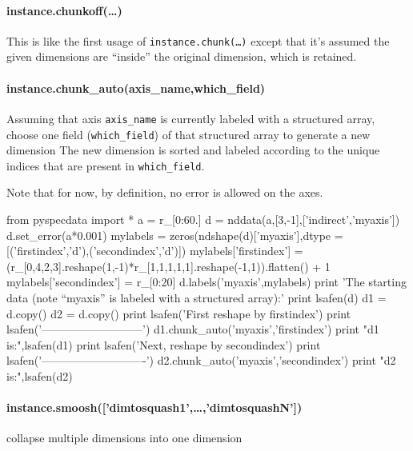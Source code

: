 \paragraph{instance.chunkoff(\ldots)}
This is like the first usage of \texttt{instance.chunk(\ldots)} except that it's assumed the given dimensions are ``inside'' the original dimension, which is retained.
\paragraph{instance.chunk\_auto(axis\_name,which\_field)}
Assuming that axis \texttt{axis\_name} is currently labeled with a structured array, choose one field (\texttt{which\_field}) of that structured array to generate a new dimension
The new dimension is sorted and labeled according to the unique indices that are present in \texttt{which\_field}.

Note that for now, by definition, no error is allowed on the axes.

\begin{python}[on]
from pyspecdata import *
a = r_[0:60.]
d = nddata(a,[3,-1],['indirect','myaxis'])
d.set_error(a*0.001)
mylabels = zeros(ndshape(d)['myaxis'],dtype = [('firstindex','d'),('secondindex','d')])
mylabels['firstindex'] = (r_[0,4,2,3].reshape(1,-1)*r_[1,1,1,1,1].reshape(-1,1)).flatten() + 1
mylabels['secondindex'] = r_[0:20]
d.labels('myaxis',mylabels)
print 'The starting data (note ``myaxis'' is labeled with a structured array):\n\n'
print lsafen(d)
d1 = d.copy()
d2 = d.copy()
print lsafen('First reshape by firstindex')
print lsafen('---------------------------')
d1.chunk_auto('myaxis','firstindex')
print "d1 is:",lsafen(d1)
print lsafen('Next, reshape by secondindex')
print lsafen('----------------------------')
d2.chunk_auto('myaxis','secondindex')
print "d2 is:",lsafen(d2)
\end{python}

\paragraph{instance.smoosh(['dimtosquash1',\ldots,'dimtosquashN'])}
collapse multiple dimensions into one dimension

